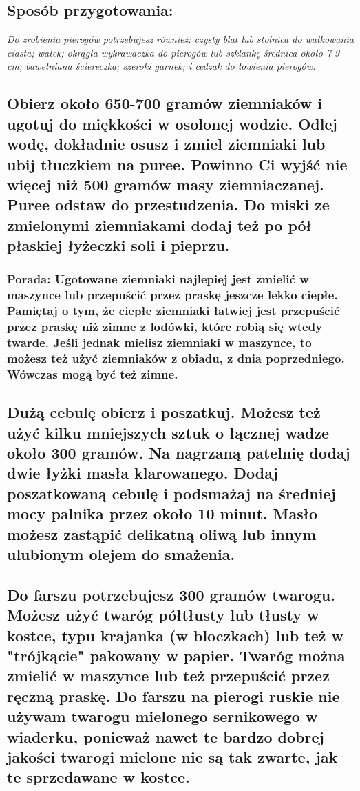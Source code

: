 \documentclass[12pt, letterpaper, titlepage]{article}
\begin{document}
\subsection*{Sposób przygotowania:}

\textit{Do zrobienia pierogów potrzebujesz również: czysty blat lub stolnica do wałkowania ciasta; wałek; okrągła wykrawaczka do pierogów lub szklankę średnica około 7-9 cm; bawełniana ściereczka; szeroki garnek; i cedzak do łowienia pierogów.}

\subsection*{Obierz około 650-700 gramów ziemniaków i ugotuj do miękkości w osolonej wodzie. Odlej wodę, dokładnie osusz i zmiel ziemniaki lub ubij tłuczkiem na puree. Powinno Ci wyjść nie więcej niż 500 gramów masy ziemniaczanej. Puree odstaw do przestudzenia. Do miski ze zmielonymi ziemniakami dodaj też po pół płaskiej łyżeczki soli i pieprzu.}

\subsubsection*{Porada: Ugotowane ziemniaki najlepiej jest zmielić w maszynce lub przepuścić przez praskę jeszcze lekko ciepłe. Pamiętaj o tym, że ciepłe ziemniaki łatwiej jest przepuścić przez praskę niż zimne z lodówki, które robią się wtedy twarde. Jeśli jednak mielisz ziemniaki w maszynce, to możesz też użyć ziemniaków z obiadu, z dnia poprzedniego. Wówczas mogą być też zimne.}

\subsection*{Dużą cebulę obierz i poszatkuj. Możesz też użyć kilku mniejszych sztuk o łącznej wadze około 300 gramów. Na nagrzaną patelnię dodaj dwie łyżki masła klarowanego. Dodaj poszatkowaną cebulę i podsmażaj na średniej mocy palnika przez około 10 minut. Masło możesz zastąpić delikatną oliwą lub innym ulubionym olejem do smażenia.}


\subsection*{Do farszu potrzebujesz 300 gramów twarogu. Możesz użyć twaróg półtłusty lub tłusty w kostce, typu krajanka (w bloczkach) lub też w "trójkącie" pakowany w papier. Twaróg można zmielić w maszynce lub też przepuścić przez ręczną praskę. Do farszu na pierogi ruskie nie używam twarogu mielonego sernikowego w wiaderku, ponieważ nawet te bardzo dobrej jakości twarogi mielone nie są tak zwarte, jak te sprzedawane w kostce.}
\end{document}
